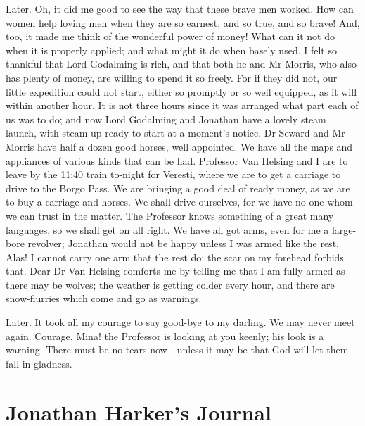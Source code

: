 \begin{diary}{Later.}
Oh, it did me good to see the way that these brave men worked. How can women help loving men when they are so earnest, and so true, and so brave! And, too, it made me think of the wonderful power of money! What can it not do when it is properly applied; and what might it do when basely used. I felt so thankful that Lord Godalming is rich, and that both he and Mr Morris, who also has plenty of money, are willing to spend it so freely. For if they did not, our little expedition could not start, either so promptly or so well equipped, as it will within another hour. It is not three hours since it was arranged what part each of us was to do; and now Lord Godalming and Jonathan have a lovely steam launch, with steam up ready to start at a moment's notice. Dr Seward and Mr Morris have half a dozen good horses, well appointed. We have all the maps and appliances of various kinds that can be had. Professor Van Helsing and I are to leave by the 11:40 train to-night for Veresti, where we are to get a carriage to drive to the Borgo Pass. We are bringing a good deal of ready money, as we are to buy a carriage and horses. We shall drive ourselves, for we have no one whom we can trust in the matter. The Professor knows something of a great many languages, so we shall get on all right. We have all got arms, even for me a large-bore revolver; Jonathan would not be happy unless I was armed like the rest. Alas! I cannot carry one arm that the rest do; the scar on my forehead forbids that. Dear Dr Van Helsing comforts me by telling me that I am fully armed as there may be wolves; the weather is getting colder every hour, and there are snow-flurries which come and go as warnings.
\end{diary}

 

\begin{diary}{Later.}
It took all my courage to say good-bye to my darling. We may never meet again. Courage, Mina! the Professor is looking at you keenly; his look is a warning. There must be no tears now—unless it may be that God will let them fall in gladness.
	\end{diary}


\section{Jonathan Harker's Journal}

